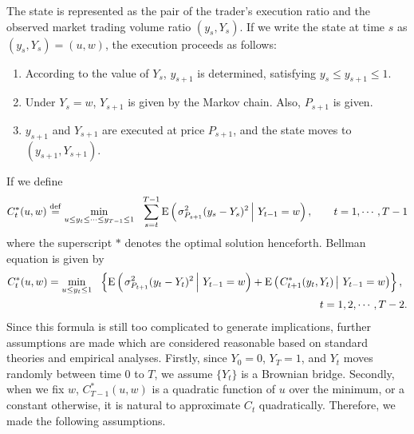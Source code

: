 The state is represented as the pair of the trader's execution ratio and the 
observed market trading volume ratio $(y_s,Y_s)$.  If we write the state at time 
$s$ as $(y_s,Y_s)=(u,w)$, the execution proceeds as follows:

\begin{enumerate}
 \item According to the value of $Y_s$, $y_{s+1}$ is determined, satisfying $y_s 
\leq y_{s+1} \leq 1$.
 \item Under $Y_s=w$, $Y_{s+1}$ is given by the Markov chain.  Also, $P_{s+1}$ 
is given.
 \item $y_{s+1}$ and $Y_{s+1}$ are executed at price $P_{s+1}$, and the state 
moves to $(y_{s+1}, Y_{s+1})$.
\end{enumerate}
If we define
\[ %
  C_t^*(u,w) \define \min_{u \leq y_t \leq \cdots \leq y_{T-1} \leq 1} \ \ 
    \sum_{s=t}^{T-1} \cex{\sigma_{P_{s+1}}^2 (y_s - Y_s)^2}{Y_{t-1}=w}, \qquad
    t=1,\cdots,T-1
\] %
where the superscript $*$ denotes the optimal solution henceforth.  Bellman 
equation is given by 
\begin{eqnarray}
  \lefteqn{C_t^*(u,w) = \min_{u \leq y_t \leq 1} \ \ \left\{
     \cex{\sigma_{P_{t+1}}^2 (y_t-Y_t)^2}{Y_{t-1}=w} + 
\cex{C_{t+1}^*(y_t,Y_t)}{Y_{t-1}=w} \right\},} \label{eq_d11} \\
  & & \hspace*{10cm} t=1,2,\cdots,T-2. \nonumber
\end{eqnarray}
Since this formula is still too complicated to generate implications, further 
assumptions are made which are considered reasonable based on standard theories 
and empirical analyses.  Firstly, since $Y_0=0$, $Y_T=1$, and $Y_t$ moves 
randomly between time 0 to $T$, we assume $\{ Y_t \}$ is a Brownian bridge.  Secondly, when we fix $w$, $C_{T-1}^*(u,w)$ is a quadratic function of $u$ over the minimum, or a constant otherwise,  it is natural to approximate $C_t$ quadratically.  
Therefore, we made the following assumptions.
